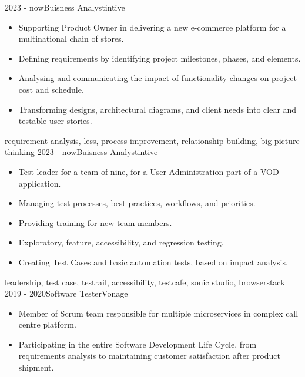 \begin{experiences}
\experience
    {2023 - now}{Buisness Analyst}{intive}{}
    {} {
        \begin{itemize}
            \item Supporting Product Owner in delivering a new e-commerce platform for a multinational chain of stores.
            \item Defining requirements by identifying project milestones, phases, and elements.
            \item Analysing and communicating the impact of functionality changes on project cost and schedule.
            \item Transforming designs, architectural diagrams, and client needs into clear and testable user stories.
        \end{itemize}
        } {\sc requirement analysis, \sc less, \sc process improvement, \sc relationship building, \sc big picture thinking}
\emptySeparator
\experience
    {2023 - now}{Buisness Analyst}{intive}{}
    {} {
        \begin{itemize}
            \item Test leader for a team of nine, for a User Administration part of a VOD application.
            \item Managing test processes, best practices, workflows, and priorities.
            \item Providing training for new team members.
            \item Exploratory, feature, accessibility, and regression testing.
            \item Creating Test Cases and basic automation tests, based on impact analysis.
        \end{itemize}
        } {\sc leadership, \sc test case, \sc testrail, \sc accessibility, \sc testcafe, \sc sonic studio, \sc browserstack}
\emptySeparator
\experience
    {2019 - 2020}{Software Tester}{Vonage}{}
    {} {
        \begin{itemize}
            \item Member of Scrum team responsible for multiple microservices in complex call centre platform.
            \item Participating in the entire Software Development Life Cycle, from requirements analysis to maintaining customer satisfaction after product shipment.

\end{itemize}}
\end{experiences}
